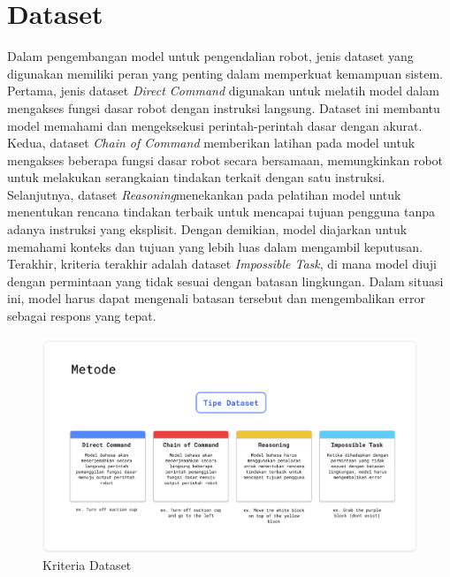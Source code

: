 \section{Dataset}
Dalam pengembangan model untuk pengendalian robot, jenis dataset yang digunakan memiliki peran yang penting dalam memperkuat kemampuan sistem. Pertama, jenis dataset \textit{Direct Command} digunakan untuk melatih model dalam mengakses fungsi dasar robot dengan instruksi langsung. Dataset ini membantu model memahami dan mengeksekusi perintah-perintah dasar dengan akurat. Kedua, dataset \textit{Chain of Command} memberikan latihan pada model untuk mengakses beberapa fungsi dasar robot secara bersamaan, memungkinkan robot untuk melakukan serangkaian tindakan terkait dengan satu instruksi. Selanjutnya, dataset \textit{Reasoning}menekankan pada pelatihan model untuk menentukan rencana tindakan terbaik untuk mencapai tujuan pengguna tanpa adanya instruksi yang eksplisit. Dengan demikian, model diajarkan untuk memahami konteks dan tujuan yang lebih luas dalam mengambil keputusan. Terakhir, kriteria terakhir adalah dataset \textit{Impossible Task}, di mana model diuji dengan permintaan yang tidak sesuai dengan batasan lingkungan. Dalam situasi ini, model harus dapat mengenali batasan tersebut dan mengembalikan error sebagai respons yang tepat.



\begin{figure} [H] \centering
  \includegraphics[scale=0.17]{gambar/tip_dat.jpg}
  \caption{Kriteria Dataset}
\end{figure}

